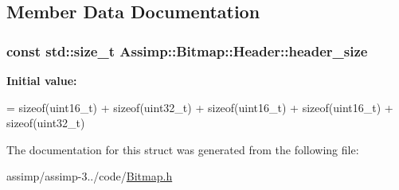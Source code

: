 \subsection{Member Data Documentation}
\hypertarget{struct_assimp_1_1_bitmap_1_1_header_a156b3c6e357fe39a5083014a097d2aa8}{
\subsubsection[{header\+\_\+size}]{\setlength{\rightskip}{0pt plus 5cm}const std\+::size\+\_\+t Assimp\+::\+Bitmap\+::\+Header\+::header\+\_\+size\hspace{0.3cm}{\ttfamily [static]}}}\label{struct_assimp_1_1_bitmap_1_1_header_a156b3c6e357fe39a5083014a097d2aa8}
{\bfseries Initial value\+:}
\begin{DoxyCode}
=
                \textcolor{keyword}{sizeof}(uint16\_t) + 
                \textcolor{keyword}{sizeof}(uint32\_t) + 
                \textcolor{keyword}{sizeof}(uint16\_t) + 
                \textcolor{keyword}{sizeof}(uint16\_t) + 
                \textcolor{keyword}{sizeof}(uint32\_t)
\end{DoxyCode}


The documentation for this struct was generated from the following file\+:\begin{DoxyCompactItemize}
\item 
assimp/assimp-\/3../code/\hyperlink{_bitmap_8h}{Bitmap.\+h}\end{DoxyCompactItemize}
